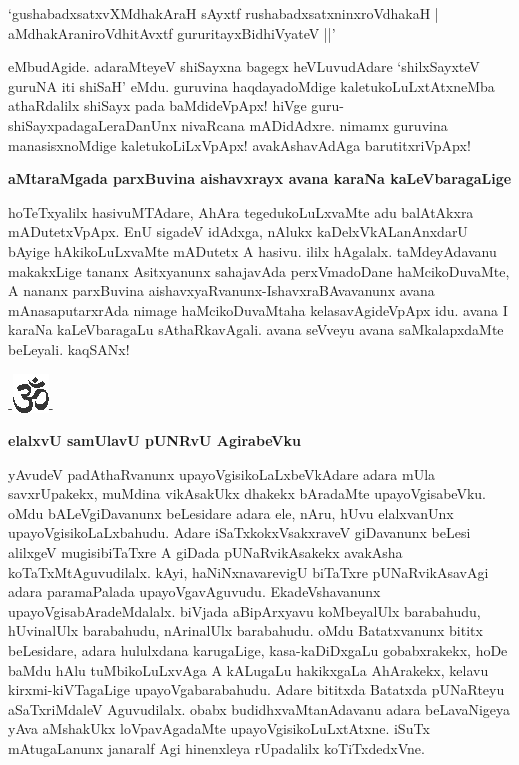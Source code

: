 \begin{shloka}
`gushabadxsatxvXMdhakAraH sAyxtf rushabadxsatxninxroVdhakaH |\\\label{190}
aMdhakAraniroVdhitAvxtf gururitayxBidhiVyateV ||'
\end{shloka}

eMbudAgide. adaraMteyeV shiSayxna bagegx heVLuvudAdare `shilxSayxteV guruNA iti shiSaH'\label{190} eMdu. guruvina haqdayadoMdige kaletukoLuLxtAtxneMba athaRdalilx shiSayx pada baMdideVpApx! hiVge guru- shiSayxpadagaLeraDanUnx nivaRcana mADidAdxre. nimamx guruvina manasisxnoMdige kaletukoLiLxVpApx! avakAshavAdAga barutitxriVpApx!

\noindent
{\bf\large{aMtaraMgada parxBuvina aishavxrayx avana karaNa kaLeVbaragaLige}}\label{page190}

hoTeTxyalilx hasivuMTAdare, AhAra tegedukoLuLxvaMte adu balAtAkxra mADutetxVpApx. EnU sigadeV idAdxga, nAlukx kaDelxVkALanAnxdarU bAyige hAkikoLuLxvaMte mADutetx A hasivu. ililx hAgalalx. taMdeyAdavanu makakxLige tananx Asitxyanunx sahajavAda perxVmadoDane haMcikoDuvaMte, A nananx parxBuvina aishavxyaRvanunx-IshavxraBAvavanunx avana mAnasaputarxrAda nimage haMcikoDuvaMtaha kelasavAgideVpApx idu. avana I karaNa kaLeVbaragaLu sAthaRkavAgali. avana seVveyu avana saMkalapxdaMte beLeyali. kaqSANx!

\begin{center}
-\includegraphics{om.eps}-
\end{center}

\noindent
{\bf\large{elalxvU samUlavU pUNRvU AgirabeVku}}\label{page190}

yAvudeV padAthaRvanunx upayoVgisikoLaLxbeVkAdare adara mUla savxrUpakekx, muMdina vikAsakUkx dhakekx bAradaMte upayoVgisabeVku. oMdu bALeVgiDavanunx beLesidare adara ele, nAru, hUvu elalxvanUnx upayoVgisikoLaLxbahudu. Adare iSaTxkokxVsakxraveV giDavanunx beLesi alilxgeV mugisibiTaTxre A giDada pUNaRvikAsakekx avakAsha koTaTxMtAguvudilalx. kAyi, haNiNxnavarevigU biTaTxre pUNaRvikAsavAgi adara paramaPalada upayoVgavAguvudu. EkadeVshavanunx upayoVgisabAradeMdalalx. biVjada aBipArxyavu koMbeyalUlx barabahudu, hUvinalUlx barabahudu, nArinalUlx barabahudu. oMdu Batatxvanunx bititx beLesidare, adara hululxdana karugaLige, kasa-kaDiDxgaLu gobabxrakekx, hoDe baMdu hAlu tuMbikoLuLxvAga A kALugaLu hakikxgaLa AhArakekx, kelavu kirxmi-kiVTagaLige upayoVgabarabahudu. Adare bititxda Batatxda pUNaRteyu aSaTxriMdaleV Aguvudilalx. obabx budidhxvaMtanAdavanu adara beLavaNigeya yAva aMshakUkx loVpavAgadaMte upayoVgisikoLuLxtAtxne. iSuTx mAtugaLanunx janaralf Agi hinenxleya rUpadalilx koTiTxdedxVne.

